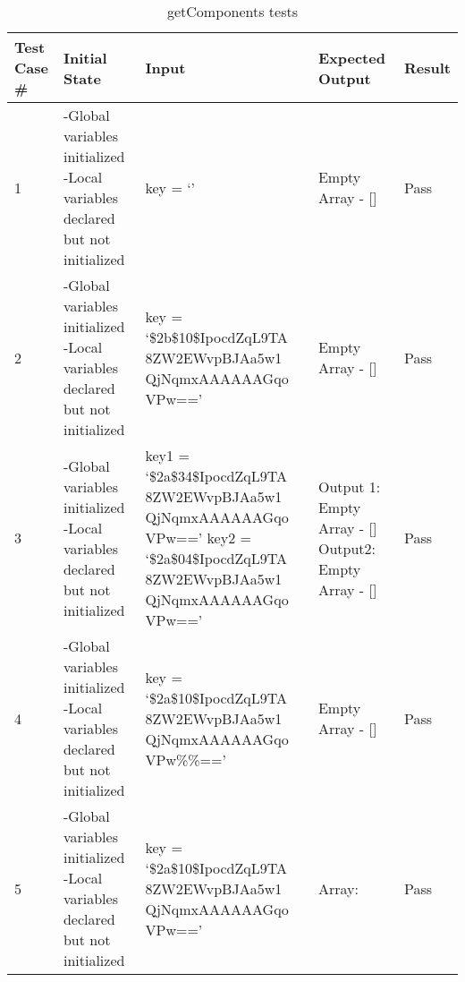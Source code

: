 \documentclass[12pt]{article}
\begin{document}
\begin{table}[H]
\centering
      \caption{getComponents tests}
        \label{tab:table3}
      \begin{tabular}{ | p{1cm} | p{5cm} | p{4cm} | p{3cm} | p{1.2cm} | }
        \hline
            \textbf{Test Case \#} & \textbf{Initial State} & \textbf{Input} & \textbf{Expected Output} & \textbf{Result} \\
        \hline
          1 & -Global variables initialized \newline -Local variables declared but not initialized & key = `' & Empty Array - [] & Pass \\
        \hline
          2 & -Global variables initialized \newline -Local variables declared but not initialized & key = `\$2b\$10\$IpocdZqL9TA \newline8ZW2EWvpBJAa5w1 \newline QjNqmxAAAAAAGqo \newline VPw==' & Empty Array - [] & Pass \\
        \hline
          3 & -Global variables initialized \newline -Local variables declared but not initialized & key1 = `\$2a\$34\$IpocdZqL9TA \newline8ZW2EWvpBJAa5w1 \newline QjNqmxAAAAAAGqo \newline VPw==' \newline key2 = `\$2a\$04\$IpocdZqL9TA \newline 8ZW2EWvpBJAa5w1 \newline QjNqmxAAAAAAGqo \newline VPw==' & Output 1: \newline Empty Array - [] \newline Output2: \newline Empty Array - [] & Pass \\
        \hline
          4 & -Global variables initialized \newline -Local variables declared but not initialized & key = `\$2a\$10\$IpocdZqL9TA \newline8ZW2EWvpBJAa5w1 \newline QjNqmxAAAAAAGqo \newline VPw\%\%==' & Empty Array - [] & Pass \\
          \hline
            5 & -Global variables initialized \newline -Local variables declared but not initialized & key = `\$2a\$10\$IpocdZqL9TA \newline8ZW2EWvpBJAa5w1 \newline QjNqmxAAAAAAGqo \newline VPw==' & Array: \newline [`2a',10, \newline `IpocdZqL9TA8 \newline ZW2EWvpBJA', \newline `a5w1QjNqmxA \newline AAAAAGqo \newline VPw=='] & Pass \\
       \hline
      \end{tabular}
  \end{table}
\end{document}
